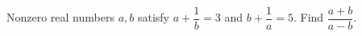 Nonzero real numbers $a,b$ satisfy $a+\dfrac{1}{b}=3$ and $b+\dfrac{1}{a}=5$. Find $\dfrac{a+b}{a-b}$.
